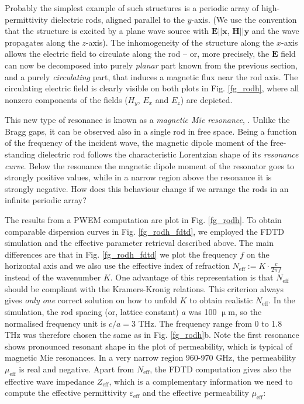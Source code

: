 {Probably the simplest example of such structures is a periodic array of high-permittivity dielectric rods, aligned parallel to the $y$-axis. (We use the convention that the structure is excited by a plane wave source with $\mathbf E || \mathbf x$, $\mathbf H || \mathbf y$ and the wave propagates along the $z$-axis). %
The inhomogeneity of the structure along the $x$-axis allows the electric field to circulate along the rod -- or, more precisely, the $\mathbf E$ field can now be decomposed into purely \textit{planar} part known from the previous section, %
and a purely \textit{circulating} part, that induces a magnetic flux near the rod axis. The circulating electric field is clearly visible on both plots in Fig. \ref{fg_rodh}, where all nonzero components of the fields ($H_y$, $E_x$ and $E_z$) are depicted. 

This new type of resonance is known as a \textit{magnetic Mie resonance}, \cite{obrien2002photonic, nemec2009tunable, yahiaoui2009broadband, yahiaoui2011tunable}. Unlike the Bragg gaps, it can be observed also in a single rod in free space. Being a function of the frequency of the incident wave, the magnetic dipole moment of the free-standing dielectric rod follows the characteristic Lorentzian shape of its \textit{resonance curve}. Below the resonance the magnetic dipole moment of the resonator goes to strongly positive values, while in a narrow region above the resonance it is strongly negative. How does this behaviour change if we arrange the rods in an infinite periodic array? 


The results from a PWEM computation are plot in Fig. \ref{fg_rodh}. To obtain comparable dispersion curves in Fig. \ref{fg_rodh_fdtd}, we employed the FDTD simulation and the effective parameter retrieval described above. The main differences are that in Fig. \ref{fg_rodh_fdtd} we plot the frequency $f$ on the horizontal axis and we also use the effective index of refraction $N_{\text{eff}} := K\cdot \frac{c}{2\pi\,f}$ instead of the wavenumber $K$. One advantage of this representation is that $N_{\text{eff}}$ should be compliant with the Kramers-Kronig relations. This criterion always gives \textit{only one} correct solution on how to unfold $K$ to obtain realistic $N_{\text{eff}}$. 
In the simulation, the rod spacing (or, lattice constant) $a$ was 100 $\upmu$m, so the normalised frequency unit is $c/a = 3$ THz. The frequency range from 0 to 1.8 THz was therefore chosen the same as in Fig. \ref{fg_rodh}b. 
Note the first resonance shows pronounced resonant shape in the plot of permeability, which is typical of magnetic Mie resonances. In a very narrow region 960-970 GHz, the permeability $\mu_{\text{eff}}$ is real and negative. 
Apart from $N_{\text{eff}}$, the FDTD computation gives also the effective wave impedance $Z_{\text{eff}}$, which is a complementary information we need to compute the effective permittivity $\varepsilon_{\text{eff}}$ and the effective permeability $\mu_{\text{eff}}$:

}
